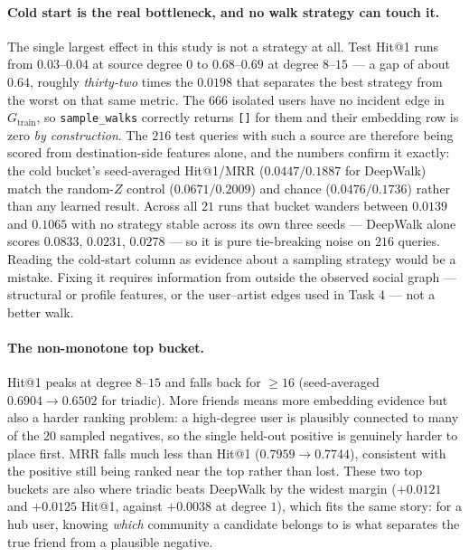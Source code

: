 \paragraph{Cold start is the real bottleneck, and no walk strategy can touch it.}
The single largest effect in this study is not a strategy at all.  Test Hit@1 runs from
$0.03$--$0.04$ at source degree $0$ to $0.68$--$0.69$ at degree $8$--$15$ --- a gap of
about $0.64$, roughly \emph{thirty-two} times the $0.0198$ that separates the best
strategy from the worst on that same metric.
The $666$ isolated users have no incident edge in $G_{\mathrm{train}}$, so
\texttt{sample\_walks} correctly returns \texttt{[]} for them and their embedding row is
zero \emph{by construction}.  The $216$ test queries with such a source are therefore
being scored from destination-side features alone, and the numbers confirm it exactly:
the cold bucket's seed-averaged Hit@1/MRR ($0.0447/0.1887$ for DeepWalk) match the
random-$Z$ control ($0.0671/0.2009$) and chance ($0.0476/0.1736$) rather than any learned
result.  Across all $21$ runs that bucket wanders between $0.0139$ and $0.1065$ with no
strategy stable across its own three seeds --- DeepWalk alone scores $0.0833$, $0.0231$,
$0.0278$ --- so it is pure tie-breaking noise on $216$ queries.  Reading the cold-start
column as evidence about a sampling strategy would be a mistake.  Fixing it
requires information from outside the observed social graph --- structural or profile
features, or the user--artist edges used in Task 4 --- not a better walk.

\paragraph{The non-monotone top bucket.}
Hit@1 peaks at degree $8$--$15$ and falls back for $\ge 16$ (seed-averaged
$0.6904 \to 0.6502$ for triadic).  More friends means more embedding evidence but also a
harder ranking problem: a high-degree user is plausibly connected to many of the $20$
sampled negatives, so the single held-out positive is genuinely harder to place first.
MRR falls much less than Hit@1 ($0.7959\to0.7744$), consistent with the positive still
being ranked near the top rather than lost.  These two top buckets are also where triadic
beats DeepWalk by the widest margin ($+0.0121$ and $+0.0125$ Hit@1, against $+0.0038$ at
degree $1$), which fits the same story: for a hub user, knowing \emph{which} community a
candidate belongs to is what separates the true friend from a plausible negative.

